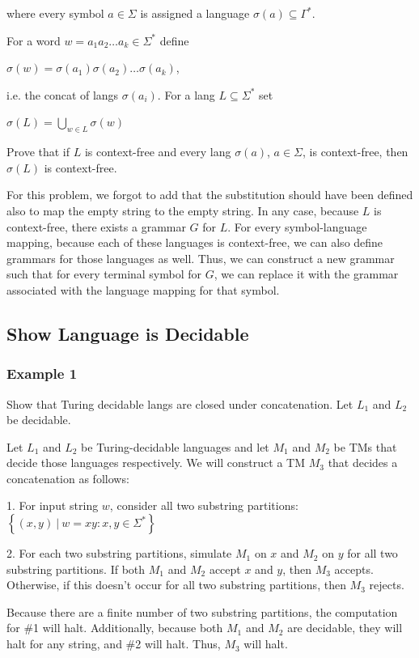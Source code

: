 where every symbol $a \in \Sigma$ is assigned a language $\sigma(a)
\subseteq \Gamma^*$.

For a word $w = a_1 a_2 \dots a_k \in \Sigma^*$ define

\hspace{1cm}$\sigma(w) = \sigma(a_1) \sigma(a_2) \dots \sigma(a_k)$,

i.e. the concat of langs $\sigma(a_i)$. For a lang $L\subseteq\Sigma^*$
set

\hspace{1cm}$\sigma(L) = \bigcup_{w\in L}\sigma(w)$

Prove that if $L$ is context-free and every lang $\sigma(a)$, $a
\in\Sigma$, is context-free, then $\sigma(L)$ is context-free.

For this problem, we forgot to add that the substitution should have
been defined also to map the empty string to the empty string. In any
case, because $L$ is context-free, there exists a grammar $G$ for $L$.
For every symbol-language mapping, because each of these languages is
context-free, we can also define grammars for those languages as well.
Thus, we can construct a new grammar such that for every terminal symbol
for $G$, we can replace it with the grammar associated with the language
mapping for that symbol.

\subsection{Show Language is Decidable}
\subsubsection{Example 1}
Show that Turing decidable langs are closed under concatenation. Let
$L_1$ and $L_2$ be decidable.

Let $L_1$ and $L_2$ be Turing-decidable languages and let $M_1$ and
$M_2$ be TMs that decide those languages respectively. We will construct
a TM $M_3$ that decides a concatenation as follows:

1. For input string $w$, consider all two substring partitions:
$\left\{(x,y) ~|~ w = xy: x,y \in \Sigma^\ast\right\}$

2. For each two substring partitions, simulate $M_1$ on $x$ and $M_2$ on
$y$ for all two substring partitions. If both $M_1$ and $M_2$ accept $x$
and $y$, then $M_3$ accepts. Otherwise, if this doesn't occur for all
two substring partitions, then $M_3$ rejects.

Because there are a finite number of two substring partitions, the
computation for \#1 will halt. Additionally, because both $M_1$ and
$M_2$ are decidable, they will halt for any string, and \#2 will halt.
Thus, $M_3$ will halt.

